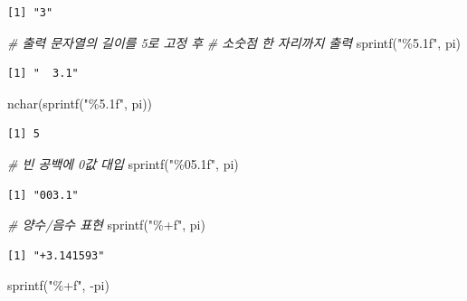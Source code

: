 \documentclass[
  11pt,
]{krantz}
\newenvironment{Shaded}{\begin{snugshade}}{\end{snugshade}}
\newcommand{\CommentTok}[1]{\textcolor[rgb]{0.37,0.37,0.37}{\textit{#1}}}
\newcommand{\FunctionTok}[1]{\textcolor[rgb]{0,0,0}{#1}}
\newcommand{\NormalTok}[1]{#1}
\newcommand{\SpecialCharTok}[1]{\textcolor[rgb]{0,0,0}{#1}}
\newcommand{\StringTok}[1]{\textcolor[rgb]{0.5,0.5,0.5}{#1}}
\begin{document}
\begin{verbatim}
[1] "3"
\end{verbatim}

\begin{Shaded}
\begin{Highlighting}[]
\CommentTok{\# 출력 문자열의 길이를 5로 고정 후}
\CommentTok{\# 소숫점 한 자리까지 출력}
\FunctionTok{sprintf}\NormalTok{(}\StringTok{"\%5.1f"}\NormalTok{, pi)}
\end{Highlighting}
\end{Shaded}

\begin{verbatim}
[1] "  3.1"
\end{verbatim}

\begin{Shaded}
\begin{Highlighting}[]
\FunctionTok{nchar}\NormalTok{(}\FunctionTok{sprintf}\NormalTok{(}\StringTok{"\%5.1f"}\NormalTok{, pi))}
\end{Highlighting}
\end{Shaded}

\begin{verbatim}
[1] 5
\end{verbatim}

\begin{Shaded}
\begin{Highlighting}[]
\CommentTok{\# 빈 공백에 0값 대입}
\FunctionTok{sprintf}\NormalTok{(}\StringTok{"\%05.1f"}\NormalTok{, pi)}
\end{Highlighting}
\end{Shaded}

\begin{verbatim}
[1] "003.1"
\end{verbatim}

\begin{Shaded}
\begin{Highlighting}[]
\CommentTok{\# 양수/음수 표현}
\FunctionTok{sprintf}\NormalTok{(}\StringTok{"\%+f"}\NormalTok{, pi)}
\end{Highlighting}
\end{Shaded}

\begin{verbatim}
[1] "+3.141593"
\end{verbatim}

\begin{Shaded}
\begin{Highlighting}[]
\FunctionTok{sprintf}\NormalTok{(}\StringTok{"\%+f"}\NormalTok{, }\SpecialCharTok{{-}}\NormalTok{pi)}
\end{Highlighting}
\end{Shaded}
\end{document}
